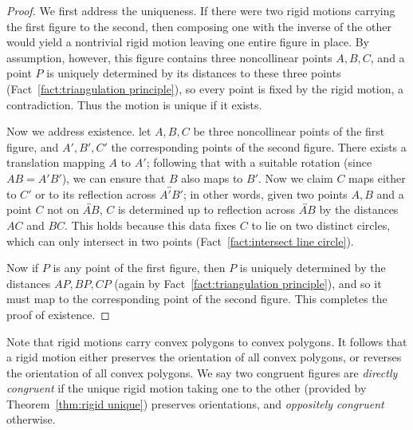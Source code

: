 \documentclass[12pt]{book}
\numberwithin{exc}{section}
\numberwithin{figure}{section}
\numberwithin{equation}{theorem}
\def\line#1{\overleftrightarrow{#1}}
\begin{document}
\begin{proof}
We first address the uniqueness. If there were two rigid motions 
carrying the first figure to the second, then composing one with the 
inverse of the other would yield a nontrivial rigid motion leaving 
one entire figure in place. By assumption, however, this figure 
contains three noncollinear points $A, B, C$, and a point $P$ is 
uniquely determined by its distances to these three points (Fact~\ref{fact:triangulation principle}), so every point is fixed by the rigid motion, a 
contradiction. Thus the motion is unique if it exists.

Now we address existence.
let $A, B, C$ be three noncollinear points of the first figure, and
$A', B', C'$ the corresponding points of the second figure. There 
exists a translation mapping $A$ to $A'$; following that with a 
suitable rotation (since $AB = A'B'$), we can ensure that $B$ also 
maps to $B'$. Now we claim $C$ maps either to $C'$ or to its 
reflection across $\line{A'B'}$; in other words, given two points $A,B$ and 
a point $C$ not on $\line{AB}$, $C$ is determined up to reflection across 
$\line{AB}$ by the distances $AC$ and $BC$. This holds because 
this data fixes $C$ to lie on two distinct circles, which 
can only intersect in two points (Fact~\ref{fact:intersect line circle}).

Now if $P$ is any point of the first figure, then $P$ is uniquely 
determined by the distances $AP, BP, CP$ (again by
Fact~\ref{fact:triangulation principle}),
and so it must map to the corresponding point of the second figure. 
This completes the proof of existence.
\end{proof}

Note that rigid motions carry convex polygons to convex polygons.
It follows that a rigid motion either preserves the orientation of all
convex polygons, or reverses the orientation of all convex polygons.
We say two congruent figures are \emph{directly congruent}
 if the unique
rigid motion taking one to the other (provided by
Theorem~\ref{thm:rigid unique}) preserves orientations, and
\emph{oppositely congruent}  otherwise.
\end{document}
